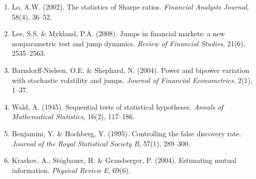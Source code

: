 \documentclass[11pt,a4paper]{article}
\begin{document}
\begin{enumerate}
    \item Lo, A.W. (2002). The statistics of Sharpe ratios. \textit{Financial Analysts Journal}, 58(4), 36--52.
    \item Lee, S.S. \& Mykland, P.A. (2008). Jumps in financial markets: a new nonparametric test and jump dynamics. \textit{Review of Financial Studies}, 21(6), 2535--2563.
    \item Barndorff-Nielsen, O.E. \& Shephard, N. (2004). Power and bipower variation with stochastic volatility and jumps. \textit{Journal of Financial Econometrics}, 2(1), 1--37.
    \item Wald, A. (1945). Sequential tests of statistical hypotheses. \textit{Annals of Mathematical Statistics}, 16(2), 117--186.
    \item Benjamini, Y. \& Hochberg, Y. (1995). Controlling the false discovery rate. \textit{Journal of the Royal Statistical Society B}, 57(1), 289--300.
    \item Kraskov, A., St\"ogbauer, H. \& Grassberger, P. (2004). Estimating mutual information. \textit{Physical Review E}, 69(6).
\end{enumerate}
\end{document}
